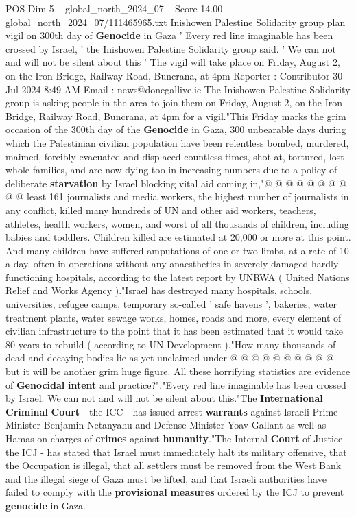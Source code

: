 \begin{textsample}{POS Dim 5 – global\_north\_2024\_07 – Score 14.00 – global\_north\_2024\_07/111465965.txt}  \label{ex:f5_pos_307}
Inishowen Palestine Solidarity group plan vigil on 300th day of \textbf{Genocide} in Gaza ' Every red line imaginable has been crossed by Israel, ' the Inishowen Palestine Solidarity group said. ' We can not and will not be silent about this ' The vigil will take place on Friday, August 2, on the Iron Bridge, Railway Road, Buncrana, at 4pm Reporter : Contributor 30 Jul 2024 8:49 AM Email : news@donegallive.ie The Inishowen Palestine Solidarity group is asking people in the area to join them on Friday, August 2, on the Iron Bridge, Railway Road, Buncrana, at 4pm for a vigil."This Friday marks the grim occasion of the 300th day of the \textbf{Genocide} in Gaza, 300 unbearable days during which the Palestinian civilian population have been relentless bombed, murdered, maimed, forcibly evacuated and displaced countless times, shot at, tortured, lost whole families, and are now dying too in increasing numbers due to a policy of deliberate \textbf{starvation} by Israel blocking vital aid coming in,"@ @ @ @ @ @ @ @ @ @ least 161 journalists and media workers, the highest number of journalists in any conflict, killed many hundreds of UN and other aid workers, teachers, athletes, health workers, women, and worst of all thousands of children, including babies and toddlers.
Children killed are estimated at 20,000 or more at this point.
And many children have suffered amputations of one or two limbs, at a rate of 10 a day, often in operations without any anaesthetics in severely damaged hardly functioning hospitals, according to the latest report by UNRWA ( United Nations Relief and Works Agency )."Israel has destroyed many hospitals, schools, universities, refugee camps, temporary so-called ' safe havens ', bakeries, water treatment plants, water sewage works, homes, roads and more, every element of civilian infrastructure to the point that it has been estimated that it would take 80 years to rebuild ( according to UN Development )."How many thousands of dead and decaying bodies lie as yet unclaimed under @ @ @ @ @ @ @ @ @ @ but it will be another grim huge figure.
All these horrifying statistics are evidence of \textbf{Genocidal} \textbf{intent} and practice?"."Every red line imaginable has been crossed by Israel.
We can not and will not be silent about this."The \textbf{International} \textbf{Criminal} \textbf{Court} - the ICC - has issued arrest \textbf{warrants} against Israeli Prime Minister Benjamin Netanyahu and Defense Minister Yoav Gallant as well as Hamas on charges of \textbf{crimes} against \textbf{humanity}."The Internal \textbf{Court} of Justice - the ICJ - has stated that Israel must immediately halt its military offensive, that the Occupation is illegal, that all settlers must be removed from the West Bank and the illegal siege of Gaza must be lifted, and that Israeli authorities have failed to comply with the \textbf{provisional} \textbf{measures} ordered by the ICJ to prevent \textbf{genocide} in Gaza.

\end{textsample}

